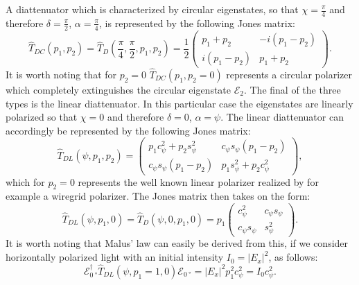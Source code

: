A diattenuator which is characterized by circular eigenstates, so that $\chi=\frac{\pi}{4}$ and therefore $\delta=\frac{\pi}{2}$, $\alpha=\frac{\pi}{4}$, is represented by the following Jones matrix:
\begin{equation}
    \hat{T}_{DC}(p_1, p_2) = \hat{T}_D\left(\frac{\pi}{4}, \frac{\pi}{2}, p_1, p_2\right) =
    \frac{1}{2}
    \begin{pmatrix} 
    p_1 + p_2 & -i(p_1 - p_2) \\
    i(p_1 - p_2) & p_1 + p_2
    \end{pmatrix}.
\end{equation}
It is worth noting that for $p_2=0$ $\hat{T}_{DC}(p_1, p_2=0)$ represents a circular polarizer which completely extinguishes the circular eigenstate $\bm{\mathcal{E}}_2$. The final of the three types is the linear diattenuator. In this particular case the eigenstates are linearly polarized so that $\chi=0$ and therefore $\delta=0$, $\alpha=\psi$. The linear diattenuator can accordingly be represented by the following Jones matrix:
\begin{equation}
    \hat{T}_{DL}(\psi, p_1, p_2) = 
    \begin{pmatrix} 
    p_1c_{\psi}^2 + p_2s_{\psi}^2 & c_{\psi}s_{\psi}(p_1 - p_2) \\
    c_{\psi}s_{\psi}(p_1 - p_2) & p_1s_{\psi}^2 + p_2c_{\psi}^2
    \end{pmatrix},
\end{equation}
which for $p_2=0$ represents the well known linear polarizer realized by for example a wiregrid polarizer. The Jones matrix then takes on the form:
\begin{equation}
    \hat{T}_{DL}(\psi, p_1, 0) = \hat{T}_{D}(\psi, 0, p_1, 0) =
    p_1
    \begin{pmatrix} 
    c_{\psi}^2 & c_{\psi}s_{\psi} \\
    c_{\psi}s_{\psi} & s_{\psi}^2
    \end{pmatrix}.
\end{equation}
It is worth noting that Malus' law can easily be derived from this, if we consider horizontally polarized light with an initial intensity $I_0=|E_x|^2$, as follows:
\begin{equation}
    \bm{\mathcal{E}}_{\SI{0}{\degree}}^{\dagger}
    \hat{T}_{DL}(\psi, p_1=1, 0)\bm{\mathcal{E}}_{\SI{0}{\degree}} = |E_x|^2p_1^2c_{\psi}^2 = I_0 c_{\psi}^2.
\end{equation}

